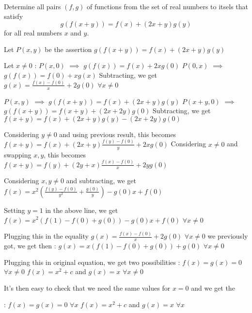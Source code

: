 \begin{solution}
	\begin{tcolorbox}Determine all pairs $(f,g)$ of functions from the set of real numbers to itsels that satisfy \[g(f(x+y)) = f(x) + (2x + y)g(y)\] for all real numbers $x$ and $y.$\end{tcolorbox}
Let $P(x,y)$ be the assertion $g(f(x+y))=f(x)+(2x+y)g(y)$

Let $x\ne 0$ :
$P(x,0)$ $\implies$ $g(f(x))=f(x)+2xg(0)$
$P(0,x)$ $\implies$ $g(f(x))=f(0)+xg(x)$
Subtracting, we get $g(x)=\frac{f(x)-f(0)}x+2g(0)$ $\forall x\ne 0$

$P(x,y)$ $\implies$ $g(f(x+y))=f(x)+(2x+y)g(y)$
$P(x+y,0)$ $\implies$ $g(f(x+y))=f(x+y)+(2x+2y)g(0)$
Subtracting, we get $f(x+y)=f(x)+(2x+y)g(y)-(2x+2y)g(0)$

Considering $y\ne 0$ and using previous result, this becomes $f(x+y)=f(x)+(2x+y)\frac{f(y)-f(0)}y+2xg(0)$
Considering $x\ne 0$ and swapping $x,y$, this becomes $f(x+y)=f(y)+(2y+x)\frac{f(x)-f(0)}x+2yg(0)$

Considering $x,y\ne 0$ and subtracting, we get $f(x)=x^2(\frac{f(y)-f(0)}{y^2}+\frac{g(0)}y)-g(0)x+f(0)$

Setting $y=1$ in the above line, we get $f(x)=x^2(f(1)-f(0)+g(0))-g(0)x+f(0)$ $\forall x\ne 0$

Plugging this in the equality $g(x)=\frac{f(x)-f(0)}x+2g(0)$ $\forall x\ne 0$ we previously got, we get then :
$g(x)=x(f(1)-f(0)+g(0))+g(0)$ $\forall x\ne 0$

Plugging this in original equation, we get two possibilities :
$f(x)=g(x)=0$ $\forall x\ne 0$
$f(x)=x^2+c$ and $g(x)=x$ $\forall x\ne 0$

It's then easy to check that we need the same values for $x=0$ and we get the :
$f(x)=g(x)=0$ $\forall x$
$f(x)=x^2+c$ and $g(x)=x$ $\forall x$
\end{solution}



